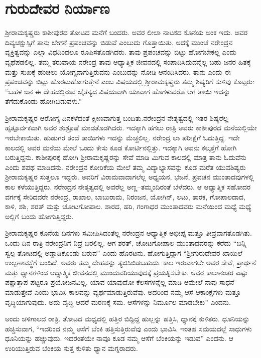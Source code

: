 
\chapter{ಗುರುದೇವರ ನಿರ್ಯಾಣ}

ಶ‍್ರೀರಾಮಕೃಷ್ಣರು ಕಾಶೀಪುರದ ತೋಟದ ಮನೆಗೆ ಬಂದರು. ಅವರ ಲೀಲಾ ನಾಟಕದ ಕೊನೆಯ ಅಂಕ ಇದು. ಅವರ ದಿವ್ಯಚಕ್ಷುಸ್ಸಿಗೆ ತಾನು ಬೇಗನೆ ಪ್ರಪಂಚವನ್ನು ಬಿಡುವೆ ಎಂಬುದು ಗೊತ್ತಾಯಿತು. ಅದಕ್ಕೆ ಮುಂಚೆ ನರೇಂದ್ರನ ವ್ಯಕ್ತಿತ್ವವನ್ನು ಎಲ್ಲಾ ವಿಧದಿಂದಲೂ ರೂಪಿಸತೊಡಗಿದರು. ತಾವು ಪ್ರಪಂಚವನ್ನು ಬಿಟ್ಟು ಹೋಗಬೇಕಲ್ಲ ಎಂದು ವ್ಯಥೆಪಡಲಿಲ್ಲ. ತಮ್ಮ ತರುವಾಯ ನರೇಂದ್ರ ತಾವು ಆಧ್ಯಾತ್ಮಿಕ ಜೀವನದಲ್ಲಿ ಸಂಪಾದಿಸಿದುದನ್ನೆಲ್ಲ ಬಹು ಜನರ ಹಿತಕ್ಕೆ ಮತ್ತು ಸುಖಕ್ಕೆ ಹಂಚಲು ಯೋಗ್ಯನಾಗುತ್ತಿರುವನು ಎಂಬುದನ್ನು ನೋಡಿ ಆನಂದಿಸಿದರು. ತಾನು ಎಂದು ಈ ಪ್ರಪಂಚವನ್ನು ಬಿಟ್ಟು ಹೊರಟುಹೋಗುತ್ತೇನೆ ಎಂಬ ವಿಷಯದಲ್ಲಿ ಶ‍್ರೀರಾಮಕೃಷ್ಣರು ತಮ್ಮ ಶಿಷ್ಯರಿಗೆ ಸುಳಿವು ಕೊಟ್ಟರು: “ಬಹಳ ಜನ ಈ ದೇಹದಲ್ಲಿರುವ ಚೈತನ್ಯದ ವಿಷಯವಾಗಿ ಯಾವಾಗ ಹೊಗಳುವರೊ ಆಗ ತಾಯಿ ಇದನ್ನು ತೆಗೆದುಕೊಂಡು ಹೋಗಿಬಿಡುವಳು.”

ಶ‍್ರೀರಾಮಕೃಷ್ಣರ ಆರೋಗ್ಯ ದಿನಕಳೆದಂತೆ ಕ್ಷೀಣವಾಗುತ್ತ ಬಂದಿತು.ನರೇಂದ್ರನ ನೇತೃತ್ವದಲ್ಲಿ ಇತರ ಶಿಷ್ಯರೆಲ್ಲ ಹೃತ್ಪೂರ್ವಕವಾಗಿ ಅವರ ಶುಶ್ರೂಷೆ ಮಾಡತೊಡಗಿದರು. ಇದಕ್ಕಾಗಿ ಹಗಲು ರಾತ್ರಿ ಅವರು ಕಾಶೀಪುರದ ಮನೆಯಲ್ಲಿಯೇ ಇರಬೇಕಾಯಿತು. ಹುಡುಗರ ತಂದೆ ತಾಯಿಗಳು ಇದನ್ನು ಮೆಚ್ಚಲಿಲ್ಲ. ನರೇಂದ್ರ ಲಾ ಪರೀಕ್ಷೆಗೆ ಓದುತ್ತಿದ್ದ. ಇದೇ ಕಾಲದಲ್ಲಿ ಅವರ ಮನೆಯ ಮೇಲೆ ಒಂದು ಕೇಸು ಕೂಡ ಕೋರ್ಟಿನಲ್ಲಿತ್ತು. ಇದಕ್ಕಾಗಿ ಅವನು ಕಲ್ಕತ್ತೆಗೆ ಹೋಗಿ ಬರುತ್ತಿದ್ದನು. ಕಾಶೀಪುರಕ್ಕೆ ಹೋಗಿ ಶ‍್ರೀರಾಮಕೃಷ್ಣರನ್ನು ಸೇವೆ ಮಾಡಿ ಮಿಗುವ ಕಾಲದಲ್ಲಿ ಮಾತ್ರ ತಾನು ಓದುವೆನು ಎಂದು ಶಪಥ ಮಾಡಿದನು. ನರೇಂದ್ರನ ಕೋರಿಕೆಯ ಮೇಲೆ ತಮ್ಮ ವಿದ್ಯಾಭ್ಯಾಸವನ್ನು ಕೂಡ ಮರೆತ ಯುವಶಿಷ್ಯರು ಶ‍್ರೀರಾಮಕೃಷ್ಣರ ಸುತ್ತಲೂ ಇದ್ದರು. ಅವರಿಗೆ ವಿರಾಮವಾದಾಗಲೆಲ್ಲ ಅಧ್ಯಯನ, ಭಜನೆ, ಪ್ರವಚನ ಮುಂತಾದವುಗಳಲ್ಲಿ ಕಾಲ ಕಳೆಯುತ್ತಿದ್ದರು. ನರೇಂದ್ರನ ನೇತೃತ್ವದಲ್ಲಿ ಅವರೆಲ್ಲ ಅಣ್ಣ–ತಮ್ಮಂದಿರಂತೆ ಬೆಳೆದರು. ಆ ಆಧ್ಯಾತ್ಮಿಕ ಸಹೋದರ ವರ್ಗಕ್ಕೆ ಸೇರಿದವರೇ ನರೇಂದ್ರ, ರಾಖಾಲ, ಬಾಬುರಾಮ, ನಿರಂಜನ, ಯೋಗಿನ್, ಲಟು, ತಾರಕ, ಗೋಪಾಲದಾದ, ಕಾಳಿ, ಶಶಿ, ಶರತ್ ಮತ್ತು ಚೋಟಗೋಪಾಲ. ಶಾರದ, ಹರಿ, ಗಂಗಾಧರ ಮುಂತಾದವರು ಮನೆಯಿಂದ ಮಧ್ಯೆ ಮಧ್ಯೆ ಅಲ್ಲಿಗೆ ಬಂದು ಹೋಗುತ್ತಿದ್ದರು.

ಶ‍್ರೀರಾಮಕೃಷ್ಣರ ಕೊನೆಯ ದಿನಗಳು ಸಮೀಪಿಸಿದಂತೆಲ್ಲ ನರೇಂದ್ರನ ಆಧ್ಯಾತ್ಮಿಕ ಅಭೀಪ್ಸೆ ಮತ್ತೂ ತೀವ್ರವಾಗತೊಡಗಿತು. ಒಂದು ದಿನ ರಾತ್ರಿ ನರೇಂದ್ರನಿಗೆ ನಿದ್ರೆ ಬರಲಿಲ್ಲ. ಆಗ ಶರತ್, ಚೋಟಗೋಪಾಲ ಮುಂತಾದವರನ್ನು ಕರೆದು “ಬನ್ನಿ ಸ್ವಲ್ಪ ತೋಟದಲ್ಲಿ ಅಡ್ಡಾಡಿಕೊಂಡು ಬರುವ” ಎಂದು ಹೊರಟನು. ಹೋಗುತ್ತಿದ್ದಾಗ “ಶ‍್ರೀಗುರುದೇವರ ಖಾಯಿಲೆ ಉಲ್ಬಣಾವಸ್ಥೆಗೆ ಬಂದಿದೆ. ಅವರು ತಮ್ಮ ದೇಹವನ್ನು ತ್ಯಜಿಸಿಬಿಡಬಹುದು. ಕಾಲ ಇರುವಾಗಲೇ ಅವರ ಸೇವೆ, ಪ್ರಾರ್ಥನೆ ಮತ್ತು ಧ್ಯಾನಗಳಿಂದ ಆಧ್ಯಾತ್ಮಿಕ ಜೀವನದಲ್ಲಿ ಮುಂದುವರಿಯುವುದಕ್ಕೆ ಪ್ರಯತ್ನಿಸಬೇಕು. ಅವರ ಕಾಲಾನಂತರ ಎಷ್ಟು ಪಶ್ಚಾತ್ತಾಪ ಪಟ್ಟರೂ ಪ್ರಯೋಜನವಿಲ್ಲ. ಯಾವ ಯಾವುದೋ ಕೆಲಸಗಳನ್ನೆಲ್ಲ ಮಾಡಿ ಆಮೇಲೆ ನಾವು ಸಾಧನೆ ಮಾಡುತ್ತೇವೆ ಎಂದು ಭಾವಿಸಿ ಕಾಲವನ್ನು ವ್ಯರ್ಥಮಾಡುತ್ತಿರುವೆವು. ಅದರಿಂದ ನಮ್ಮ ಆಸೆ ಆಕಾಂಕ್ಷೆಗಳು ಮತ್ತೂ ವೃದ್ಧಿಯಾಗುವುದು. ಅದು ವೃದ್ಧಿ ಆದರೆ ಮರಣಕ್ಕೆ ಸಮ. ಆಸೆಗಳನ್ನು ನಿರ್ಮೂಲ ಮಾಡಬೇಕು” ಎಂದನು.

ಅಂದು ಚಳಿಗಾಲದ ರಾತ್ರಿ. ತೋಟದ ಮಧ್ಯದಲ್ಲಿ ಹತ್ತಿರ ಬಿದ್ದಿದ್ದ ಹುಲ್ಲನ್ನು ಹತ್ತಿಸಿ, ಧ್ಯಾನಕ್ಕೆ ಕುಳಿತರು. ಧೂನಿಯನ್ನು ಹಚ್ಚಿಸುವಾಗ, “ಇದರಿಂದ ನಮ್ಮ ಆಸೆಗೆ ಬೆಂಕಿ ಹತ್ತಿಸುತ್ತಿರುವೆವು ಎಂದು ಭಾವಿಸಿ. ಇಂತಹ ಸಮಯದಲ್ಲೆ ಸಾಧುಗಳು ಧೂನಿಯನ್ನು ಹಚ್ಚುವುದು. ಇದರಂತೆಯೇ ನಾವೂ ಕೂಡ ನಮ್ಮ ಆಸೆಗೆ ಬೆಂಕಿಯನ್ನು ಇಡುವ” ಎಂದನು. ಆ ಉರಿಯುತ್ತಿರುವ ಬೆಂಕಿಯ ಸುತ್ತ ಕುಳಿತು ಧ್ಯಾನ ಮಗ್ನರಾದರು.


